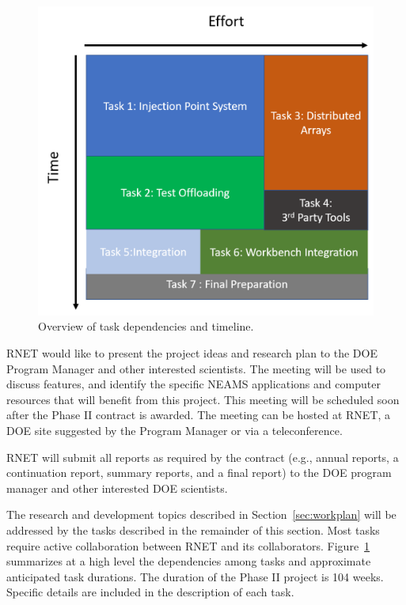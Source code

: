 \begin{figure}%
\begin{center}
\leavevmode
\includegraphics[width=1.0\linewidth]{./narrative/figures/tasks.png}
\end{center}
\caption{Overview of task dependencies and timeline.}
\label{fig:tasks}
\end{figure}

RNET would like to present the project ideas and research plan to the
DOE Program Manager and other interested scientists. The meeting will
be used to discuss features, and identify the specific NEAMS applications and computer
resources that will benefit from this project.  This meeting will be
scheduled soon after the Phase II contract is awarded. The meeting can
be hosted at RNET, a DOE site suggested by the Program Manager or via
a teleconference.

RNET will submit all reports as required by the contract (e.g., annual reports, 
a continuation report, summary reports, and a final report) to the DOE program 
manager and other interested DOE scientists.

The research and development topics described in Section~\ref{sec:workplan} 
will be addressed by the tasks described in the remainder of this section. Most 
tasks require active collaboration between RNET and its collaborators. 
Figure~\ref{fig:tasks} summarizes at a high level the dependencies among tasks  and
approximate anticipated task durations. The duration of the Phase II 
project is 104 weeks. Specific details are included in the description of each 
task.


